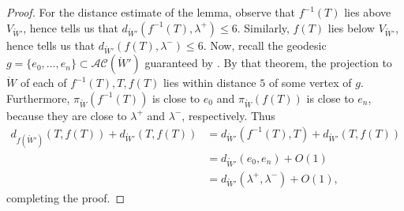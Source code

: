 \documentclass[11pt,letterpaper]{amsart}
\newcommand{\mr}{\mathring}
\newcommand{\psub}{\mr W}
\numberwithin{equation}{section}
\theoremstyle{definition}
\newcommand{\AC}{\mathcal{AC}}
\begin{document}
\begin{proof}
For the distance estimate of the lemma, observe that  $f^{-1}(T)$ lies above $V_{\psub'}$, hence  tells us that  $d_{\psub'}(f^{-1}(T), \lambda^+) \leq 6$. Similarly,  $f(T)$ lies below $V_{\psub'}$, hence  tells us that   $d_{\psub'}(f(T),  \lambda^-) \leq 6$. 
%    
%    
Now, recall the geodesic $g = \{e_0, \ldots, e_n \} \subset \AC(\psub')$ guaranteed by . 
By that theorem, the projection to $\psub$ of each of $f^{-1}(T), T, f(T)$ lies within distance $5$ of some vertex of $g$. Furthermore, $\pi_{\psub}(f^{-1}(T))$ is close to $e_0$ and $\pi_{\psub}(f(T))$ is close to $e_n$, because they are close to $\lambda^+$ and $\lambda^-$, respectively. Thus
\begin{align*}
d_{f(\psub')}(T, f(T)) + d_{\psub'}(T, f(T)) & = d_{\psub'}(f^{-1}(T), T) + d_{\psub'}(T, f(T)) \\
& = d_{\psub'} (e_0, e_n) + O(1) \\
& = d_{\psub'} (\lambda^+, \lambda^-) + O(1),
\end{align*}
completing the proof.
\end{proof}
\end{document}
